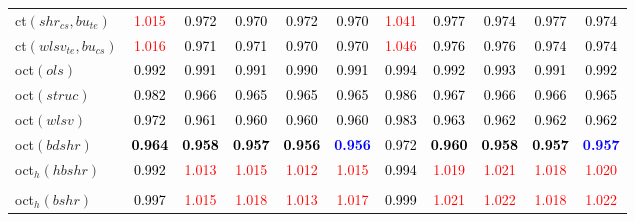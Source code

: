 \begin{tabular}[t]{l|>{}cccc>{}c|ccccc}
ct$(shr_{cs}, bu_{te})$ & \textcolor{red}{1.015} & \textcolor{black}{0.972} & \textcolor{black}{0.970} & \textcolor{black}{0.972} & \textcolor{black}{0.970} & \textcolor{red}{1.041} & \textcolor{black}{0.977} & \textcolor{black}{0.974} & \textcolor{black}{0.977} & \textcolor{black}{0.974}\\
ct$(wlsv_{te}, bu_{cs})$ & \textcolor{red}{1.016} & \textcolor{black}{0.971} & \textcolor{black}{0.971} & \textcolor{black}{0.970} & \textcolor{black}{0.970} & \textcolor{red}{1.046} & \textcolor{black}{0.976} & \textcolor{black}{0.976} & \textcolor{black}{0.974} & \textcolor{black}{0.974}\\
oct$(ols)$ & \textcolor{black}{0.992} & \textcolor{black}{0.991} & \textcolor{black}{0.991} & \textcolor{black}{0.990} & \textcolor{black}{0.991} & \textcolor{black}{0.994} & \textcolor{black}{0.992} & \textcolor{black}{0.993} & \textcolor{black}{0.991} & \textcolor{black}{0.992}\\
oct$(struc)$ & \textcolor{black}{0.982} & \textcolor{black}{0.966} & \textcolor{black}{0.965} & \textcolor{black}{0.965} & \textcolor{black}{0.965} & \textcolor{black}{0.986} & \textcolor{black}{0.967} & \textcolor{black}{0.966} & \textcolor{black}{0.966} & \textcolor{black}{0.965}\\
oct$(wlsv)$ & \textcolor{black}{0.972} & \textcolor{black}{0.961} & \textcolor{black}{0.960} & \textcolor{black}{0.960} & \textcolor{black}{0.960} & \textcolor{black}{0.983} & \textcolor{black}{0.963} & \textcolor{black}{0.962} & \textcolor{black}{0.962} & \textcolor{black}{0.962}\\
oct$(bdshr)$ & \textcolor{black}{\textbf{0.964}} & \textcolor{black}{\textbf{0.958}} & \textcolor{black}{\textbf{0.957}} & \textcolor{black}{\textbf{0.956}} & \textcolor{blue}{\textbf{0.956}} & \textcolor{black}{0.972} & \textcolor{black}{\textbf{0.960}} & \textcolor{black}{\textbf{0.958}} & \textcolor{black}{\textbf{0.957}} & \textcolor{blue}{\textbf{0.957}}\\
oct$_h(hbshr)$ & \textcolor{black}{0.992} & \textcolor{red}{1.013} & \textcolor{red}{1.015} & \textcolor{red}{1.012} & \textcolor{red}{1.015} & \textcolor{black}{0.994} & \textcolor{red}{1.019} & \textcolor{red}{1.021} & \textcolor{red}{1.018} & \textcolor{red}{1.020}\\[-1.5ex]
\hline\\[-1.5ex]
oct$_h(bshr)$ & \textcolor{black}{0.997} & \textcolor{red}{1.015} & \textcolor{red}{1.018} & \textcolor{red}{1.013} & \textcolor{red}{1.017} & \textcolor{black}{0.999} & \textcolor{red}{1.021} & \textcolor{red}{1.022} & \textcolor{red}{1.018} & \textcolor{red}{1.022}\\

\end{tabular}
